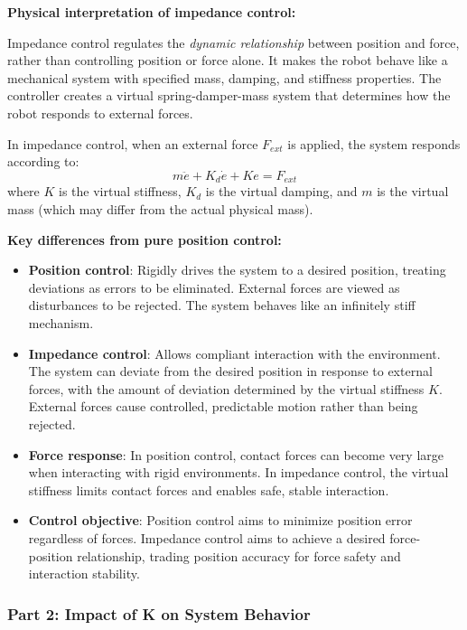 \documentclass[11pt]{article}
\begin{document}
\textbf{Physical interpretation of impedance control:}

Impedance control regulates the \textit{dynamic relationship} between position and force, rather than controlling position or force alone. It makes the robot behave like a mechanical system with specified mass, damping, and stiffness properties. The controller creates a virtual spring-damper-mass system that determines how the robot responds to external forces.

In impedance control, when an external force $F_{ext}$ is applied, the system responds according to:
\[
m\ddot{e} + K_d\dot{e} + Ke = F_{ext}
\]
where $K$ is the virtual stiffness, $K_d$ is the virtual damping, and $m$ is the virtual mass (which may differ from the actual physical mass).

\textbf{Key differences from pure position control:}

\begin{itemize}
    \item \textbf{Position control}: Rigidly drives the system to a desired position, treating deviations as errors to be eliminated. External forces are viewed as disturbances to be rejected. The system behaves like an infinitely stiff mechanism.
    
    \item \textbf{Impedance control}: Allows compliant interaction with the environment. The system can deviate from the desired position in response to external forces, with the amount of deviation determined by the virtual stiffness $K$. External forces cause controlled, predictable motion rather than being rejected.
    
    \item \textbf{Force response}: In position control, contact forces can become very large when interacting with rigid environments. In impedance control, the virtual stiffness limits contact forces and enables safe, stable interaction.
    
    \item \textbf{Control objective}: Position control aims to minimize position error regardless of forces. Impedance control aims to achieve a desired force-position relationship, trading position accuracy for force safety and interaction stability.
\end{itemize}

\subsubsection*{Part 2: Impact of K on System Behavior}
\end{document}
